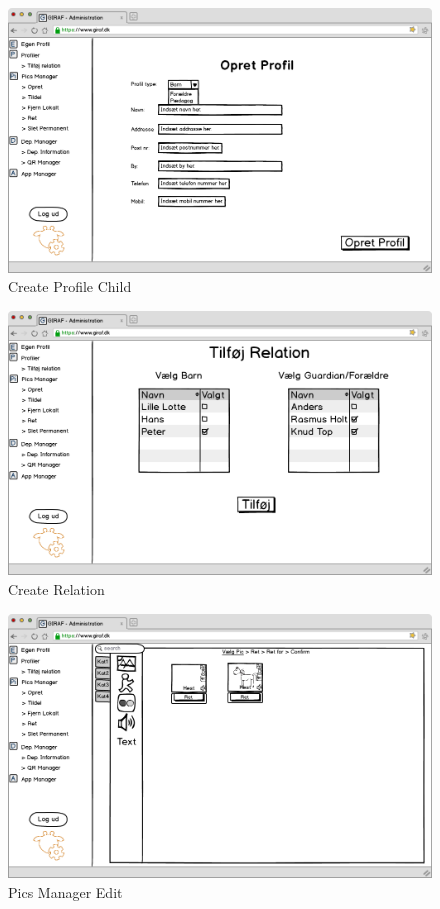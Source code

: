 \begin{figure}[p]
\centering
\includegraphics[width=14cm]{images/mockup/opretProfilBarn.png}
\caption{Create Profile Child}
\label{fig:create_profile_child}
\end{figure}

\newpage

\begin{figure}[p]
\centering
\includegraphics[width=14cm]{images/mockup/opretRelation.png}
\caption{Create Relation}
\label{fig:create_relation}
\end{figure}

\begin{figure}[p]
\centering
\includegraphics[width=14cm]{images/mockup/picsManagerEdit.png}
\caption{Pics Manager Edit}
\label{fig:pics_manager_edit}
\end{figure}


